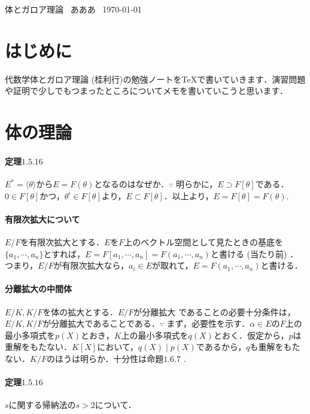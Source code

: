 \documentclass[a4paper,10pt]{ltjsarticle}
\begin{document}
\begin{center}
  {\LARGE 体とガロア理論}\
  \vskip6.5pt
  {\large あああ}\
  \vskip2pt
  {\large \today}
\end{center}

\tableofcontents
\newpage

\setcounter{section}{-1}
\section{はじめに}
代数学\rmthree 体とガロア理論 (桂利行)の勉強ノートをTeXで書いていきます．演習問題や証明で少しでもつまったところについてメモを書いていこうと思います．

\section{体の理論}

\paragraph*{定理$1.5.16$} $E^*=\langle\theta\rangle$から$E = F( \theta )$となるのはなぜか．$\because$ 明らかに，$E \supset F[\theta]$である．$0\in F[\theta]$かつ，$\theta ^ i \in F[\theta]$より，$E \subset F[\theta]$．以上より，$E = F[\theta] = F(\theta)$.

\paragraph*{有限次拡大について} $E/F$を有限次拡大とする．$E$を$F$上のベクトル空間として見たときの基底を$\{a_1, \cdots , a_n \}$とすれば，$E = F[a_1, \cdots, a_n] = F(a_1, \cdots , a_n)$と書ける (当たり前) ．つまり，$E/F$が有限次拡大なら，$a_i \in E$が取れて，$E = F(a_1, \cdots , a_n)$と書ける．

\paragraph*{分離拡大の中間体} $E/K, K/F$を体の拡大とする．$E/F$が分離拡大
であることの必要十分条件は，$E/K, K/F$が分離拡大であることである．$\because$ まず，必要性を示す．$\alpha \in E$の$F$上の最小多項式を$p(X)$とおき，$K$上の最小多項式を$q(X)$とおく．仮定から，$p$は重解をもたない．$K[X]$において，$q(X) \mid p(X)$であるから，$q$も重解をもたない．$K/F$のほうは明らか．十分性は命題$1.6.7$ . 

\paragraph*{定理$1.5.16$} $s$に関する帰納法の$s > 2$について．
\end{document}
